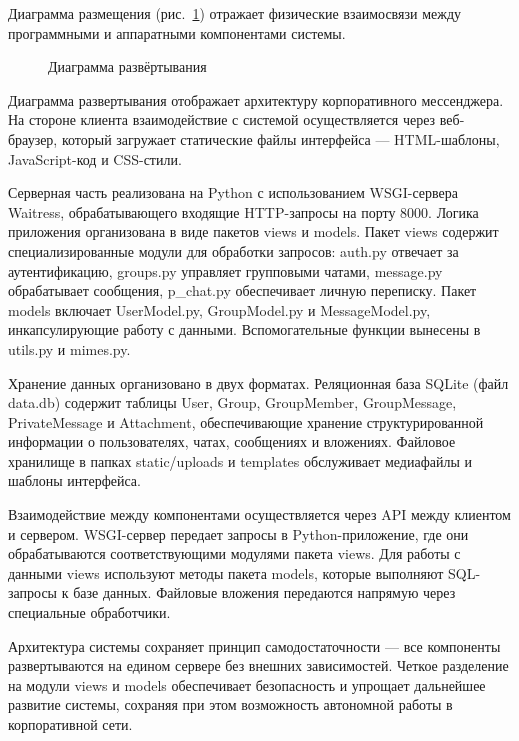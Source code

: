 Диаграмма размещения (рис.~\ref{place:image}) отражает физические взаимосвязи между программными и аппаратными компонентами системы.

\begin{figure}[ht]
\caption{Диаграмма развёртывания}
\label{place:image}
\end{figure}

Диаграмма развертывания отображает архитектуру корпоративного мессенджера. На стороне клиента взаимодействие с системой осуществляется через веб-браузер, который загружает статические файлы интерфейса — HTML-шаблоны, JavaScript-код и CSS-стили.

Серверная часть реализована на Python с использованием WSGI-сервера Waitress, обрабатывающего входящие HTTP-запросы на порту 8000. Логика приложения организована в виде пакетов views и models. Пакет views содержит специализированные модули для обработки запросов: auth.py отвечает за аутентификацию, groups.py управляет групповыми чатами, message.py обрабатывает сообщения, p\_chat.py обеспечивает личную переписку. Пакет models включает UserModel.py, GroupModel.py и MessageModel.py, инкапсулирующие работу с данными. Вспомогательные функции вынесены в utils.py и mimes.py.

Хранение данных организовано в двух форматах. Реляционная база SQLite (файл data.db) содержит таблицы User, Group, GroupMember, GroupMessage, PrivateMessage и Attachment, обеспечивающие хранение структурированной информации о пользователях, чатах, сообщениях и вложениях. Файловое хранилище в папках static/uploads и templates обслуживает медиафайлы и шаблоны интерфейса.

Взаимодействие между компонентами осуществляется через API между клиентом и сервером. WSGI-сервер передает запросы в Python-приложение, где они обрабатываются соответствующими модулями пакета views. Для работы с данными views используют методы пакета models, которые выполняют SQL-запросы к базе данных. Файловые вложения передаются напрямую через специальные обработчики.

Архитектура системы сохраняет принцип самодостаточности — все компоненты развертываются на едином сервере без внешних зависимостей. Четкое разделение на модули views и models обеспечивает безопасность и упрощает дальнейшее развитие системы, сохраняя при этом возможность автономной работы в корпоративной сети.

